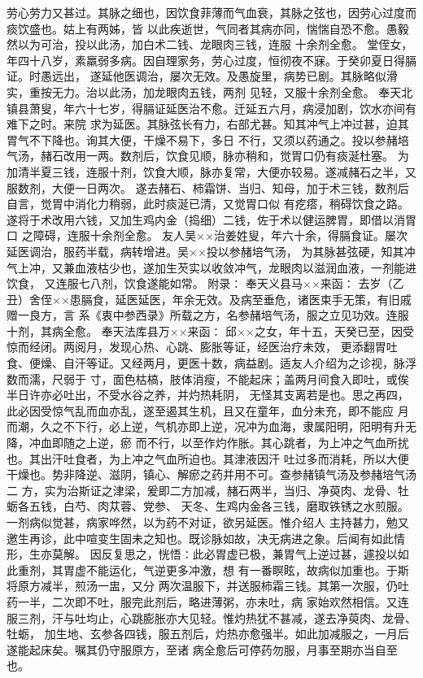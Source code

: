 \documentclass[a4paper,12pt,UTF8,twoside]{ctexbook}
\begin{document}
劳心劳力又甚过。其脉之细也，因饮食菲薄而气血衰，其脉之弦也，因劳心过度而痰饮盛也。姑上有两姊，皆 
以此疾逝世，气同者其病亦同，惴惴自恐不愈。愚毅然以为可治，投以此汤，加白术二钱、龙眼肉三钱，连服 
十余剂全愈。 
堂侄女，年四十八岁，素羸弱多病。因自理家务，劳心过度，恒彻夜不寐。于癸卯夏日得膈证。时愚远出， 
遂延他医调治，屡次无效。及愚旋里，病势已剧。其脉略似滑实，重按无力。治以此汤，加龙眼肉五钱，两剂 
见轻，又服十余剂全愈。 
奉天北镇县萧叟，年六十七岁，得膈证延医治不愈。迁延五六月，病浸加剧，饮水亦间有难下之时。来院 
求为延医。其脉弦长有力，右部尤甚。知其冲气上冲过甚，迫其胃气不下降也。询其大便，干燥不易下，多日 
不行，又须以药通之。投以参赭培气汤，赭石改用一两。数剂后，饮食见顺，脉亦稍和，觉胃口仍有痰涎杜塞。 
为加清半夏三钱，连服十剂，饮食大顺，脉亦复常，大便亦较易。遂减赭石之半，又服数剂，大便一日两次。 
遂去赭石、柿霜饼、当归、知母，加于术三钱，数剂后自言，觉胃中消化力稍弱，此时痰涎已清，又觉胃口似 
有疙瘩，稍碍饮食之路。遂将于术改用六钱，又加生鸡内金（捣细）二钱，佐于术以健运脾胃，即借以消胃口 
之障碍，连服十余剂全愈。 
友人吴××治姜姓叟，年六十余，得膈食证。屡次延医调治，服药半载，病转增进。吴××投以参赭培气汤， 
为其脉甚弦硬，知其冲气上冲，又兼血液枯少也，遂加生芡实以收敛冲气，龙眼肉以滋润血液，一剂能进饮食， 
又连服七八剂，饮食遂能如常。 
附录∶ 
奉天义县马××来函∶ 
去岁（乙丑）舍侄××患膈食，延医延医，年余无效。及病至垂危，诸医束手无策，有旧戚赠一良方，言 
系《衷中参西录》所载之方，名参赭培气汤，服之立见功效。连服十剂，其病全愈。 
奉天法库县万××来函∶ 
邱××之女，年十五，天癸已至，因受惊而经闭。两阅月，发现心热、心跳、膨胀等证，经医治疗未效， 
更添翻胃吐食、便燥、自汗等证。又经两月，更医十数，病益剧。适友人介绍为之诊视，脉浮数而濡，尺弱于 
寸，面色枯槁，肢体消瘦，不能起床；盖两月间食入即吐，或俟半日许亦必吐出，不受水谷之养，并灼热耗阴， 
无怪其支离若是也。思之再四，此必因受惊气乱而血亦乱，遂至遏其生机，且又在童年，血分未充，即不能应 
月而潮，久之不下行，必上逆，气机亦即上逆，况冲为血海，隶属阳明，阳明有升无降，冲血即随之上逆，瘀 
而不行，以至作灼作胀。其心跳者，为上冲之气血所扰也。其出汗吐食者，为上冲之气血所迫也。其津液因汗 
吐过多而消耗，所以大便干燥也。势非降逆、滋阴，镇心、解瘀之药并用不可。查参赭镇气汤及参赭培气汤二 
方，实为治斯证之津梁，爰即二方加减，赭石两半，当归、净萸肉、龙骨、牡蛎各五钱，白芍、肉苁蓉、党参、 
天冬、生鸡内金各三钱，磨取铁锈之水煎服。一剂病似觉甚，病家哗然，以为药不对证，欲另延医。惟介绍人 
主持甚力，勉又邀生再诊，此中喧变生固未之知也。既诊脉如故，决无病进之象。后闻有如此情形，生亦莫解。 
因反复思之，恍悟∶此必胃虚已极，兼胃气上逆过甚，遽投以如此重剂，其胃虚不能运化，气逆更多冲激，想 
有一番瞑眩，故病似加重也。于斯将原方减半，煎汤一盅，又分 
两次温服下，并送服柿霜三钱。其第一次服，仍吐药一半，二次即不吐，服完此剂后，略进薄粥，亦未吐，病 
家始欢然相信。又连服三剂，汗与吐均止，心跳膨胀亦大见轻。惟灼热犹不甚减，遂去净萸肉、龙骨、牡蛎， 
加生地、玄参各四钱，服五剂后，灼热亦愈强半。如此加减服之，一月后遂能起床矣。嘱其仍守服原方，至诸 
病全愈后可停药勿服，月事至期亦当自至也。 
\end{document}
